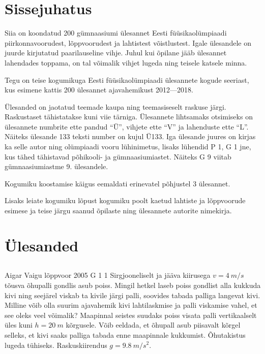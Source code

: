 \documentclass[11pt]{article}
\begin{document}
{\setlength{\parindent}{24pt}
\section{Sissejuhatus}

Siia on koondatud 200 gümnaasiumi ülesannet Eesti füüsikaolümpiaadi piirkonnavoorudest, lõppvoorudest ja lahtistest võistlustest. Igale ülesandele on juurde kirjutatud paarilauseline vihje. Juhul kui õpilane jääb ülesannet lahendades toppama, on tal võimalik vihjet lugeda ning teisele katsele minna.

Tegu on teise kogumikuga Eesti füüsikaolümpiaadi ülesannete kogude seeriast, kus esimene kattis 200 ülesannet ajavahemikust 2012---2018.

Ülesanded on jaotatud teemade kaupa ning teemasiseselt raskuse järgi. Raskustaset tähistatakse kuni viie tärniga. Ülesannete lihtsamaks otsimiseks on ülesannete numbrite ette pandud \enquote{Ü}, vihjete ette \enquote{V} ja lahenduste ette \enquote{L}. Näiteks ülesande 133 teksti number on kujul Ü133. Iga ülesande juures on kirjas ka selle autor ning olümpiaadi vooru lühinimetus, lisaks lühendid P 1, G 1 jne, kus tähed tähistavad põhikooli- ja gümnaasiumiastet. Näiteks G 9 viitab gümnaasiumiastme 9. ülesandele.

Kogumiku koostamise käigus eemaldati erinevatel põhjustel 3 ülesannet.

Lisaks leiate kogumiku lõpust kogumiku poolt kaetud lahtiste ja lõppvoorude esimese ja teise järgu saanud õpilaste ning ülesannete autorite nimekirja.
\newpage
\setlength{\parindent}{0pt}

        \section{Ülesanded}
        \ToggleStatement
        \subsection{\protect{}}

\graphicspath{{../problems/}}

{Aigar Vaigu} %
{lõppvoor} %
{2005} %
{G 1} %
{1} %
{
\ifStatement
Sirgjooneliselt ja jääva kiirusega $v = \SI{4}{m/s}$ tõusva õhupalli gondlis asub poiss. Mingil hetkel laseb poiss gondlist alla kukkuda kivi ning seejärel viskab ta kivile järgi palli, soovides tabada palliga langevat kivi. Milline võib olla suurim ajavahemik kivi lahtilaskmise ja palli viskamise vahel, et see oleks veel võimalik? Maapinnal seistes suudaks poiss visata palli vertikaalselt üles kuni $h = \SI{20}{m}$ kõrgusele. Võib eeldada, et õhupall asub piisavalt kõrgel selleks, et kivi saaks palliga tabada enne maapinnale kukkumist. Õhutakistus lugeda tühiseks. Raskuskiirendus $g = \SI{9,8}{m/s^2}$.
\fi
}

}
\end{document}
